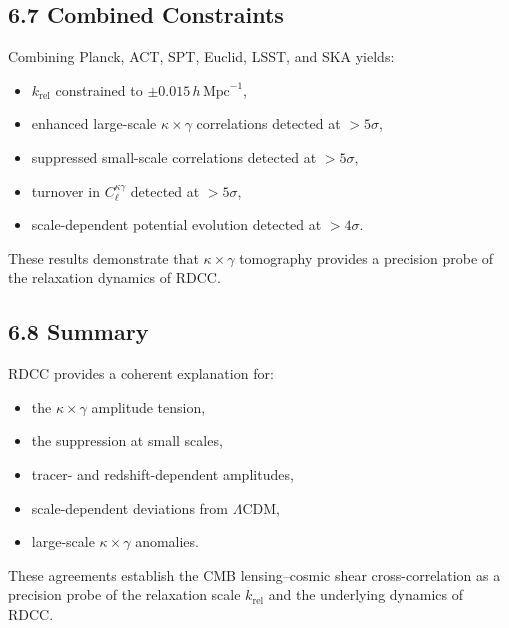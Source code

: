 \documentclass[11pt,a4paper]{article}
\begin{document}
\subsection*{6.7 Combined Constraints}

Combining Planck, ACT, SPT, Euclid, LSST, and SKA yields:

\begin{itemize}
    \item $k_{\mathrm{rel}}$ constrained to $\pm 0.015\,h\,\mathrm{Mpc}^{-1}$,
    \item enhanced large-scale $\kappa \times \gamma$ correlations detected at $>5\sigma$,
    \item suppressed small-scale correlations detected at $>5\sigma$,
    \item turnover in $C_{\ell}^{\kappa\gamma}$ detected at $>5\sigma$,
    \item scale-dependent potential evolution detected at $>4\sigma$.
\end{itemize}

These results demonstrate that $\kappa \times \gamma$ tomography provides a precision probe 
of the relaxation dynamics of RDCC.

\subsection*{6.8 Summary}

RDCC provides a coherent explanation for:

\begin{itemize}
    \item the $\kappa \times \gamma$ amplitude tension,
    \item the suppression at small scales,
    \item tracer- and redshift-dependent amplitudes,
    \item scale-dependent deviations from $\Lambda$CDM,
    \item large-scale $\kappa \times \gamma$ anomalies.
\end{itemize}

These agreements establish the CMB lensing--cosmic shear cross-correlation as a precision 
probe of the relaxation scale $k_{\mathrm{rel}}$ and the underlying dynamics of RDCC.

\end{document}
